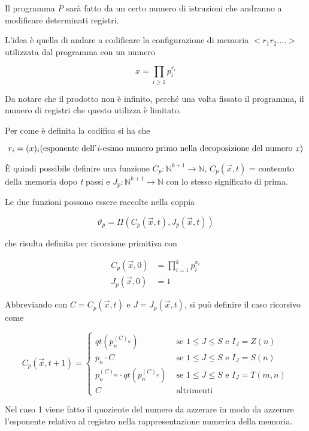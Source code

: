 
Il programma \emph{P} sarà fatto da un certo numero di istruzioni che andranno a modificare determinati registri.

L'idea è quella di andare a codificare la configurazione di memoria $ <r_1 r_2 \ldots.> $ utilizzata dal programma con un numero

$$
x = \prod\limits_{i\geq 1} p_i^{r_i}
$$

Da notare che il prodotto non è infinito, perché una volta fissato il programma, il numero di registri che questo utilizza è limitato.

Per come è definita la codifica si ha che

$$
r_i = (x)_i \text{(esponente dell'\textit{i}-esimo numero primo nella decoposizione del numero \textit{x})}
$$

È quindi possibile definire una funzione $C_p: \mathbb{N}^{k+1} \rightarrow \mathbb{N}$, $C_p(\vec{x},t)$ = contenuto della memoria dopo \textit{t} passi e $J_p: \mathbb{N}^{k+1} \rightarrow \mathbb{N}$ con lo stesso significato di prima.

Le due funzioni possono essere raccolte nella coppia

$$
\vartheta_p = \Pi(C_p(\vec{x},t),J_p(\vec{x},t))
$$

che risulta definita per ricorsione primitiva con

\begin{align*}
C_p(\vec{x},0) &= \prod\limits_{i=1}^k p_{i}^{x_i} \\
J_p(\vec{x},0) &= 1
\end{align*}

Abbreviando con $C = C_p(\vec{x},t)$ e $J = J_p(\vec{x},t)$, si può definire il caso ricorsivo come

$$
C_p(\vec{x},t+1) = \begin{cases}
qt(p_{n}^{(C)_n}) &\text{ se } 1 \leq J \leq S \text{ e } I_J = Z(n) \\
p_n \cdot C &\text{ se } 1 \leq J \leq S \text{ e } I_J = S(n) \\
p_n^{(C)_m} \cdot qt(p_{n}^{(C)_n}) &\text{ se } 1 \leq J \leq S \text{ e } I_J = T(m,n) \\
C &\text{ altrimenti } 
\end{cases}
$$

Nel caso 1 viene fatto il quoziente del numero da azzerare in modo da azzerare l'esponente relativo al registro nella rappresentazione numerica della memoria.

